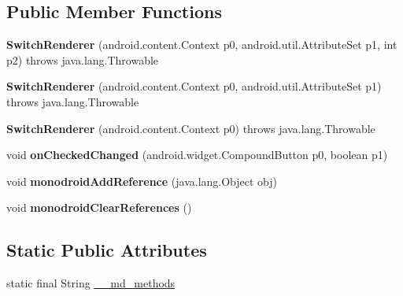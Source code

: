 \subsection*{Public Member Functions}
\begin{DoxyCompactItemize}
\item 
\mbox{\label{classmd5b60ffeb829f638581ab2bb9b1a7f4f3f_1_1SwitchRenderer_a832f5f93ae7ecd3f08aedc1037692738}} 
{\bfseries Switch\+Renderer} (android.\+content.\+Context p0, android.\+util.\+Attribute\+Set p1, int p2)  throws java.\+lang.\+Throwable 	
\item 
\mbox{\label{classmd5b60ffeb829f638581ab2bb9b1a7f4f3f_1_1SwitchRenderer_a6aa5634ceb38e4e6ba17fd3174fe2903}} 
{\bfseries Switch\+Renderer} (android.\+content.\+Context p0, android.\+util.\+Attribute\+Set p1)  throws java.\+lang.\+Throwable 	
\item 
\mbox{\label{classmd5b60ffeb829f638581ab2bb9b1a7f4f3f_1_1SwitchRenderer_aecb9a4aa4555f192e24f464151495b5d}} 
{\bfseries Switch\+Renderer} (android.\+content.\+Context p0)  throws java.\+lang.\+Throwable 	
\item 
\mbox{\label{classmd5b60ffeb829f638581ab2bb9b1a7f4f3f_1_1SwitchRenderer_acb3eb70920f926f8b36888ee849e7ab7}} 
void {\bfseries on\+Checked\+Changed} (android.\+widget.\+Compound\+Button p0, boolean p1)
\item 
\mbox{\label{classmd5b60ffeb829f638581ab2bb9b1a7f4f3f_1_1SwitchRenderer_a028e2f4c76a4c1f2172e7e22c873f457}} 
void {\bfseries monodroid\+Add\+Reference} (java.\+lang.\+Object obj)
\item 
\mbox{\label{classmd5b60ffeb829f638581ab2bb9b1a7f4f3f_1_1SwitchRenderer_a88c5734750b36ec1ff059a1db489262c}} 
void {\bfseries monodroid\+Clear\+References} ()
\end{DoxyCompactItemize}
\subsection*{Static Public Attributes}
\begin{DoxyCompactItemize}
\item 
static final String \hyperlink{classmd5b60ffeb829f638581ab2bb9b1a7f4f3f_1_1SwitchRenderer_a5d8d51148704e49b135709f942738f92}{\+\_\+\+\_\+md\+\_\+methods}
\end{DoxyCompactItemize}
